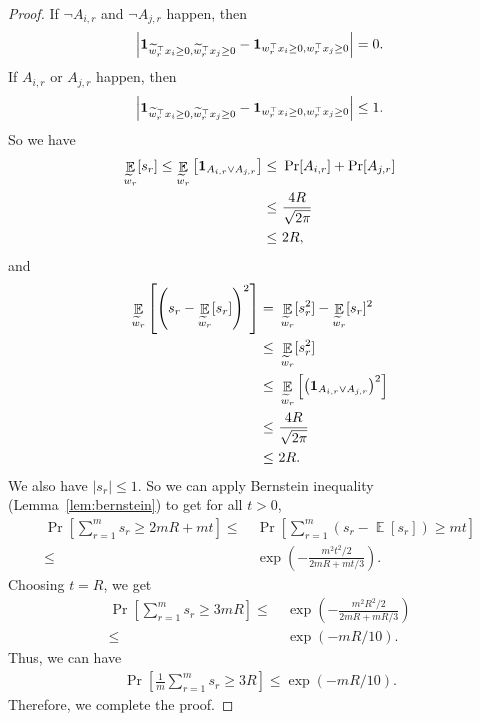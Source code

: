 \documentclass[11pt]{article}
\DeclareMathOperator*{\E}{\mathbb{E}}
\newcommand{\wt}{\widetilde}
\begin{document}
\begin{proof}
If   $\neg A_{i,r}$ and $\neg A_{j,r}$ happen,
then 
\begin{align*}
\left| {\bf 1}_{ \wt{w}_r^\top x_i \geq 0, \wt{w}_r^\top x_j \geq 0} - {\bf 1}_{ w_r^\top x_i \geq 0 , w_r^\top x_j \geq 0 } \right|=0.
\end{align*}
If   $A_{i,r}$ or $A_{j,r}$ happen,
then 
\begin{align*}
\left| {\bf 1}_{ \wt{w}_r^\top x_i \geq 0, \wt{w}_r^\top x_j \geq 0} - {\bf 1}_{ w_r^\top x_i \geq 0 , w_r^\top x_j \geq 0 } \right|\leq 1.
\end{align*}
So we have {%
\begin{align*}
 \E_{\wt{w}_r}[s_r]\leq \E_{\wt{w}_r} \left[ {\bf 1}_{A_{i,r}\vee A_{j,r}} \right] 
 \leq & ~ \Pr[A_{i,r}]+\Pr[A_{j,r}] \\
 \leq & ~ \frac {4 R}{\sqrt{2\pi}} \\
 \leq & ~ 2 R,
\end{align*}}
and {%
\begin{align*}
    \E_{\wt{w}_r} \left[ \left(s_r-\E_{\wt{w}_r}[s_r] \right)^2 \right]
    = & ~ \E_{\wt{w}_r}[s_r^2]-\E_{\wt{w}_r}[s_r]^2 \\
    \leq & ~ \E_{\wt{w}_r}[s_r^2]\\
    \leq & ~\E_{\wt{w}_r} \left[ \left( {\bf 1}_{A_{i,r}\vee A_{j,r}} \right)^2 \right] \\
     \leq & ~ \frac {4R}{\sqrt{2\pi}} \\
     \leq  &~ 2 R .
\end{align*}}
We also have $|s_r|\leq 1$.
So we can apply Bernstein inequality (Lemma~\ref{lem:bernstein}) to get for all $t>0$,{%
\begin{align*}
    \Pr \left[\sum_{r=1}^m s_r\geq 2m R +mt \right]
    \leq & ~ \Pr \left[\sum_{r=1}^m (s_r-\E[s_r])\geq mt \right]\\
    \leq & ~ \exp \left( - \frac{ m^2t^2/2 }{ 2m R   + mt/3 } \right).
\end{align*}}
Choosing $t = R$, we get
\begin{align*}
    \Pr \left[\sum_{r=1}^m s_r\geq 3mR  \right]
    \leq & ~ \exp \left( -\frac{ m^2  R^2 /2 }{ 2 m  R + m  R /3 } \right) \\
     \leq & ~ \exp \left( - m R / 10 \right) .
\end{align*}
Thus, we can have
\begin{align*}
\Pr \left[ \frac{1}{m} \sum_{r=1}^m s_r \geq 3  R \right] \leq \exp( - m R /10 ).
\end{align*}
Therefore, we complete the proof.
\end{proof}
\end{document}
